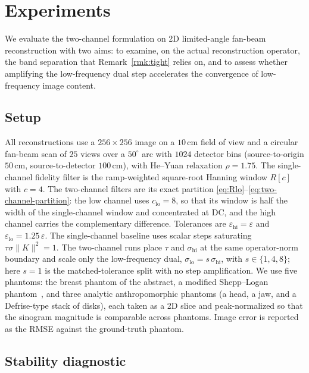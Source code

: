 \documentclass{article}
\begin{document}
\section{Experiments}
\label{sec:experiments}

We evaluate the two-channel formulation on 2D limited-angle fan-beam reconstruction with two aims: to examine, on the actual reconstruction operator, the band separation that Remark~\ref{rmk:tight} relies on, and to assess whether amplifying the low-frequency dual step accelerates the convergence of low-frequency image content.

\subsection{Setup}

All reconstructions use a $256\times256$ image on a $10\,\mathrm{cm}$ field of view and a circular fan-beam scan of $25$ views over a $50^\circ$ arc with $1024$ detector bins (source-to-origin $50\,\mathrm{cm}$, source-to-detector $100\,\mathrm{cm}$), with He--Yuan relaxation $\rho=1.75$. The single-channel fidelity filter is the ramp-weighted square-root Hanning window $R[c]$ with $c=4$. The two-channel filters are its exact partition \eqref{eq:Rlo}--\eqref{eq:two-channel-partition}: the low channel uses $c_{\mathrm{lo}}=8$, so that its window is half the width of the single-channel window and concentrated at DC, and the high channel carries the complementary difference. Tolerances are $\varepsilon_{\mathrm{hi}}=\varepsilon$ and $\varepsilon_{\mathrm{lo}}=1.25\,\varepsilon$. The single-channel baseline uses scalar steps saturating $\tau\sigma\|K\|^2=1$. The two-channel runs place $\tau$ and $\sigma_{\mathrm{hi}}$ at the same operator-norm boundary and scale only the low-frequency dual, $\sigma_{\mathrm{lo}}=s\,\sigma_{\mathrm{hi}}$, with $s\in\{1,4,8\}$; here $s=1$ is the matched-tolerance split with no step amplification. We use five phantoms: the breast phantom of the abstract, a modified Shepp--Logan phantom~\citep{shepp1974fourier}, and three analytic anthropomorphic phantoms (a head, a jaw, and a Defrise-type stack of disks), each taken as a 2D slice and peak-normalized so that the sinogram magnitude is comparable across phantoms. Image error is reported as the RMSE against the ground-truth phantom.

\subsection{Stability diagnostic}
\end{document}
